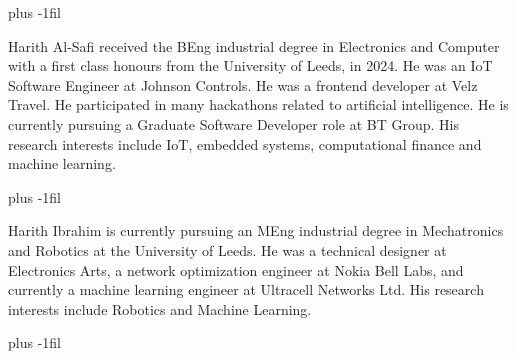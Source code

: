 \documentclass{ieeeaccess}
\begin{document}



\baselineskip plus -1fil

\begin{IEEEbiography}{Harith Al-Safi} received the BEng industrial degree in Electronics and Computer with a first class honours from the University of Leeds, in 2024. He was an IoT Software Engineer at Johnson Controls. He was a frontend developer at Velz Travel.  He participated in many hackathons related to artificial intelligence. He is currently pursuing a Graduate Software Developer role at BT Group. His research interests include IoT, embedded systems, computational finance and machine learning.
\end{IEEEbiography}

\baselineskip plus -1fil

\begin{IEEEbiography}{Harith Ibrahim} is currently pursuing an MEng industrial degree in Mechatronics and Robotics at the University of Leeds. He was a technical designer at Electronics Arts, a network optimization engineer at Nokia Bell Labs, and currently a machine learning engineer at Ultracell Networks Ltd. His research interests include Robotics and Machine Learning.
\end{IEEEbiography}

\baselineskip plus -1fil
\end{document}
